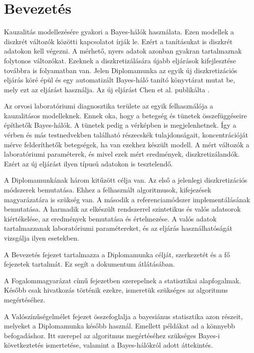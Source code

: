 \chapter*{Bevezetés}
Kauzalitás modellezésére gyakori a Bayes-hálók használata. Ezen modellek a diszkrét változók közötti kapcsolatot írják le. Ezért a tanításukat is diszkrét adatokon kell végezni. A mérhető, nyers adatok azonban gyakran tartalmaznak folytonos változókat. Ezeknek a diszkretizálására újabb eljárások kifejlesztése továbbra is folyamatban van. Jelen Diplomamunka az egyik új diszkretizációs eljárás köré épül és egy automatizált Bayes-háló tanító könyvtárat mutat be, mely ezt az eljárást használja. Az új eljárást Chen et al. publikálta \cite{chen2017learning}.

Az orvosi laboratóriumi diagnosztika területe az egyik felhasználója a kauzalitásos modelleknek. Ennek oka, hogy a betegség és tünetek összefüggéseire építhetők Bayes-hálók. A tünetek pedig a vérképben is megjelenhetnek. Így a vérben és más testnedvekben található részecskék tulajdonságait, koncentrációját mérve felderíthetők betegségek, ha van ezekhez készült modell. A mért változók a laboratóriumi paraméterek, és mivel ezek mért eredmények, diszkretizálandók. Ezért az új eljárást ilyen típusú adatokon is tesztelendő.

A Diplomamunkának három kitűzött célja van. Az első a jelenlegi diszkretizációs módszerek bemutatása. Ehhez a felhasznált algoritmusok, kifejezések magyarázatára is szükség van. A második a referenciamódszer implementálásának bemutatása. A harmadik az elkészült rendszerrel szintetikus és valós adatsorok kiértékelése, az eredmények bemutatása és értelmezése. A valós adatok tartalmazzanak laboratóriumi paramétereket, és az eljárás használhatóságát vizsgálja ilyen esetekben.

A Bevezetés fejezet tartalmazza a Diplomamunka célját, szerkezetét és a fő fejezetek tartalmát. Ez segít a dokumentum átlátásában.

A Fogalommagyarázat című fejezetben szerepelnek a statisztikai alapfogalmak. Később csak hivatkozás történik ezekre, ismeretük szükséges az algoritmus megértéséhez.

A Valószínűségelmélet fejezet összefoglalja a bayesiánus statisztika azon részeit, melyeket a Diplomamunka később használ. Emellett példákat ad a könnyebb befogadáshoz. Itt szerepel az algoritmus megértéséhez szükséges Bayes-i következtetés ismertetése, valamint a Bayes-hálókról adott áttekintés.

